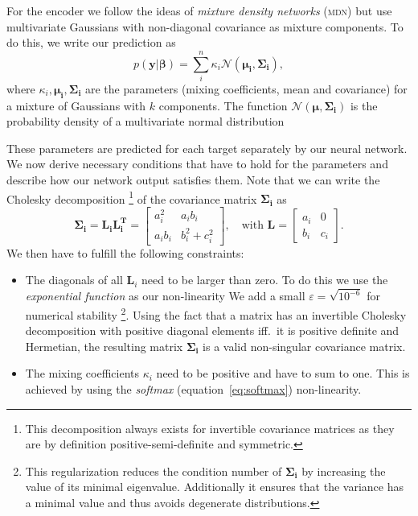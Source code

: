 \documentclass[nobib, a4paper]{tufte-handout}
\begin{document}
For the encoder we follow the ideas of \textit{mixture density networks} (\textsc{mdn}) but use multivariate Gaussians with non-diagonal covariance as mixture components\autocite{mdn}.
To do this, we write our prediction as
\begin{equation*}
p \left( \bm{y} | \bm{\beta} \right) = \sum_{i}^n \kappa_i \mathcal{N} \left( \bm{\mu_i}, \bm{\Sigma_i} \right),
\end{equation*}
where \(\kappa_i, \bm{\mu_i}, \bm{\Sigma_i}\) are the parameters (mixing coefficients, mean and covariance) for a mixture of Gaussians with \(k\) components.
The function \(\mathcal{N}(\bm{\mu}, \bm{\Sigma_i})\) is the probability density of a multivariate normal distribution 

These parameters are predicted for each target separately by our neural network.
We now derive necessary conditions that have to hold for the parameters and describe how our network output satisfies them.
Note that we can write the Cholesky decomposition%
\footnote{This decomposition always exists for invertible covariance matrices as they are by definition positive-semi-definite and symmetric.}
of the covariance matrix \(\bm{\Sigma_i}\) as
\begin{equation*}
  \bm{\Sigma_i} = \bm{L_i} \bm{L_i^T} =
  \begin{bmatrix}
    a_i^2 & a_ib_i \\
    a_ib_i & b_i^2 + c_i^2
  \end{bmatrix} ,\quad
   \text{with } \bm{L} =
   \begin{bmatrix}
     a_i & 0 \\
     b_i & c_i
   \end{bmatrix}.
\end{equation*}
We then have to fulfill the following constraints:
\begin{itemize}
\item The diagonals of all \(\bm{L}_i\) need to be larger than zero.
  To do this we use the \textit{exponential function} as our non-linearity
  We add a small \(\varepsilon = \sqrt{10^{-6}}\) for numerical stability%
  \footnote{This regularization reduces the condition number of \(\bm{\Sigma_i}\) by increasing the value of its minimal eigenvalue.
  Additionally it ensures that the variance has a minimal value and thus avoids degenerate distributions.}. %
  Using the fact that a matrix has an invertible Cholesky decomposition with positive diagonal elements iff.\ it is positive definite and Hermetian,
  the resulting matrix \(\bm{\Sigma_i}\) is a valid non-singular covariance matrix.
\item The mixing coefficients \(\kappa_i\) need to be positive and have to sum to one.
  This is achieved by using the \textit{softmax} (equation~\ref{eq:softmax}) non-linearity.

\end{itemize}
\end{document}
